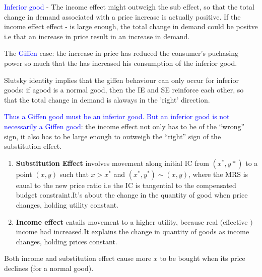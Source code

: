 \documentclass{tufte-handout}
\begin{document}

\textbullet \textcolor{blue}{Inferior good} - The income effect might outweigh   the sub effect, so that the total change in demand associated with a price increase is actually positive.  If the income effect effect - is large enough, the total change in demand could be positve i.e that an increase in price result in an increase in demand. 

The \textcolor{blue}{Giffen} case: the increase in price has reduced the consumer's puchasing power so much that the has increased his consumption of the inferior good.

Slutsky identity implies that the giffen behaviour can only occur for inferior goods: if agood is a normal good, then the IE and SE reinforce each other, so that the total change in demand is alaways in the 'right' direction.






\textcolor{blue}{Thus a Giffen good must be an inferior good. But an inferior good is not necessarily a Giffen good}: the income effect not only has to be of the “wrong” sign, it also has to be large enough to outweigh the “right” sign of the substitution effect.







\clearpage











\begin{enumerate}
		\item \textbf{Substitution Effect} involves movement along initial IC from $(x^*,y*)$ to a point $(x,y)$ such that  $x > x^*$ and $(x^*,y^*) \sim (x,y)$, where the MRS is eaual to the new price ratio i.e the IC is tangential to the compensated budget constraint.It's about the change in the quantity of good when price changes, holding utility constant. 
		\item  \textbf{Income effect} entails  movement to a higher utility, because real $($effective $)$ income had increased.It explains the change in quantity of goods as income changes, holding prices constant.
\end{enumerate}
Both income and substitution effect cause more $x$ to be bought when its price declines (for a normal good).
\end{document}
